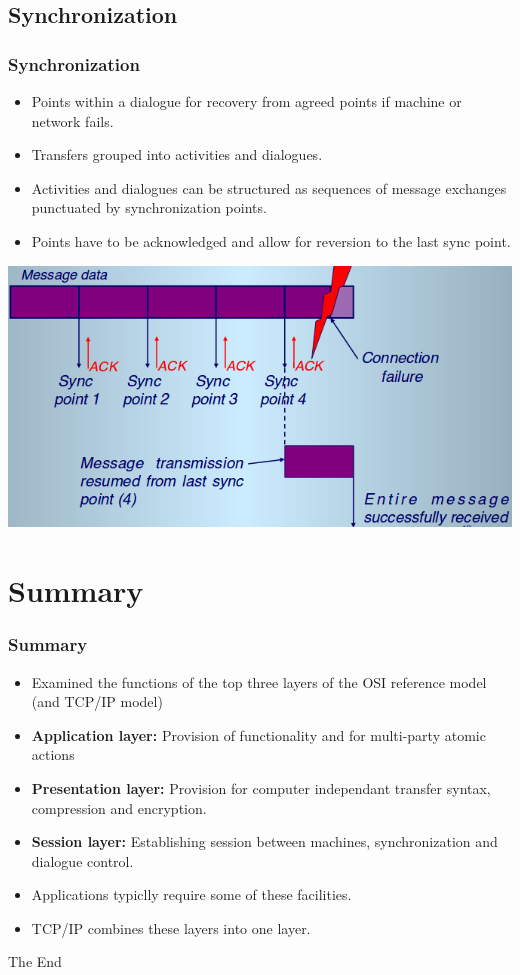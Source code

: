 \documentclass{beamer}
\begin{document}
\subsection{Synchronization}
\begin{frame}
\frametitle{Synchronization}
\begin{itemize}
\item Points within a dialogue for recovery from agreed points if machine or network fails.
\item Transfers grouped into {\color{red}activities} and {\color{green}dialogues}.
\item {\color{red}Activities} and {\color{green}dialogues} can be structured as sequences of message exchanges punctuated by synchronization points.
\item Points have to be acknowledged and allow for reversion to the last sync point.
\end{itemize}
\includegraphics[scale=0.3]{synch.png}
\end{frame}
\section{Summary}
\begin{frame}
\frametitle{Summary}
\begin{itemize}
\item Examined the functions of the top three layers of the OSI reference model (and TCP/IP model)
\item \textbf{Application layer:} Provision of functionality and for multi-party atomic actions
\item \textbf{Presentation layer:} Provision for computer independant transfer syntax, compression and encryption.
\item \textbf{Session layer:} Establishing session between machines, synchronization and dialogue control.
\item Applications typiclly require some of these facilities.
\item TCP/IP combines these layers into one layer.
\end{itemize}
\end{frame}

\begin{frame} 
\Huge{\centerline{The End}}
\end{frame}
\end{document}
